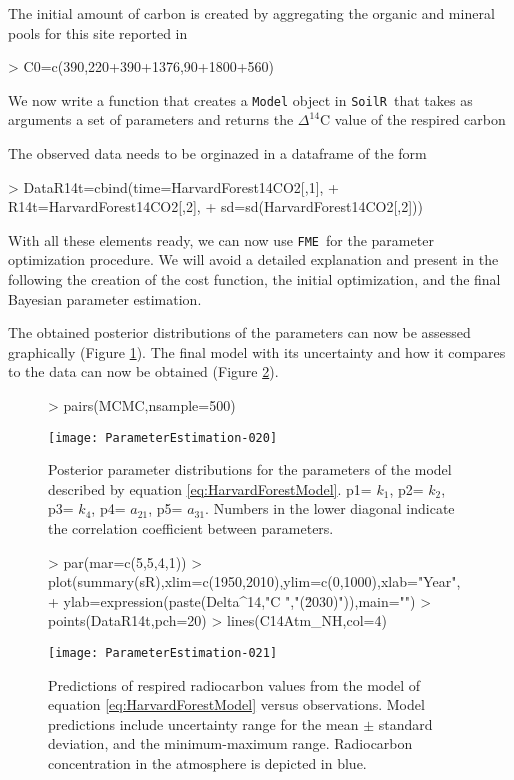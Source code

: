 \documentclass[a4paper]{article}
\newcommand{\SoilR}{\texttt{SoilR}}
\newcommand{\FME}{\texttt{FME}}
\begin{document}
The initial amount of carbon is created by aggregating the organic and mineral pools for this site reported in \citet{SierraBG}
\begin{Schunk}
\begin{Sinput}
> C0=c(390,220+390+1376,90+1800+560) 
\end{Sinput}
\end{Schunk}

We now write a function that creates a {\tt Model} object in \SoilR \, that takes as arguments a set of parameters and returns the 
$\Delta^{14}$C value of the respired carbon


The observed data needs to be orginazed in a dataframe of the form
\begin{Schunk}
\begin{Sinput}
> DataR14t=cbind(time=HarvardForest14CO2[,1],
+                R14t=HarvardForest14CO2[,2],
+                sd=sd(HarvardForest14CO2[,2]))
\end{Sinput}
\end{Schunk}


With all these elements ready, we can now use \FME \, for the parameter optimization procedure. We will avoid a detailed explanation and present in the following the creation of the cost function, the initial optimization, and the final Bayesian parameter estimation. 


The obtained posterior distributions of the parameters can now be assessed graphically (Figure \ref{fig:HFmcmc}). The final model with its uncertainty and how it compares to the data can now be obtained (Figure \ref{fig:HFmodel}). 
\begin{figure}
  \centering
\begin{Schunk}
\begin{Sinput}
> pairs(MCMC,nsample=500)
\end{Sinput}
\end{Schunk}
\texttt{[image: ParameterEstimation-020]}
  \caption{Posterior parameter distributions for the parameters of the model described by equation \ref{eq:HarvardForestModel}. p1= $k_1$, p2= $k_2$, p3= $k_4$, p4= $a_{21}$, p5= $a_{31}$. Numbers in the lower diagonal indicate the correlation coefficient between parameters.}
  \label{fig:HFmcmc}
\end{figure}


\begin{figure}
  \centering
\begin{Schunk}
\begin{Sinput}
> par(mar=c(5,5,4,1))
> plot(summary(sR),xlim=c(1950,2010),ylim=c(0,1000),xlab="Year",
+      ylab=expression(paste(Delta^14,"C ","(\u2030)")),main="")
> points(DataR14t,pch=20)
> lines(C14Atm_NH,col=4)
\end{Sinput}
\end{Schunk}
\texttt{[image: ParameterEstimation-021]}
  \caption{Predictions of respired radiocarbon values from the model of equation \ref{eq:HarvardForestModel} versus observations. Model predictions include uncertainty range for the mean $\pm$ standard deviation, and the minimum-maximum range. Radiocarbon concentration in the atmosphere is depicted in blue.}
  \label{fig:HFmodel}
\end{figure}
\end{document}
